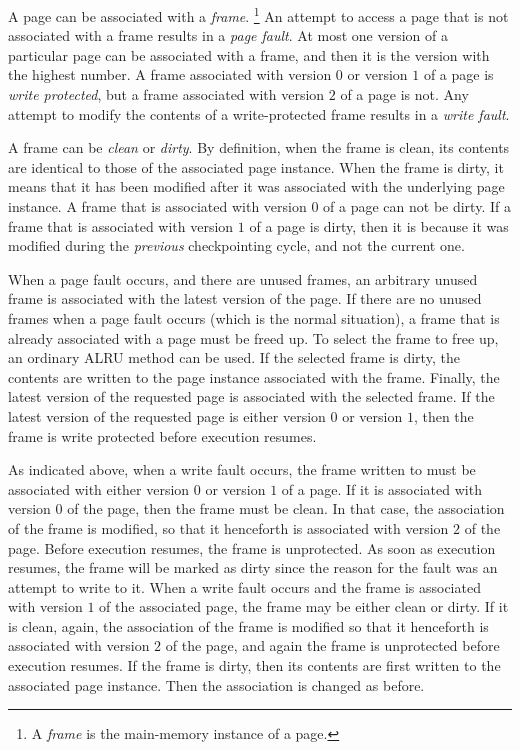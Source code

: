 A page can be associated with a \emph{frame}.%
\footnote{A \emph{frame} is the main-memory instance of a page.}  An
attempt to access a page that is not associated with a frame results
in a \emph{page fault}.  At most one version of a particular page can
be associated with a frame, and then it is the version with the
highest number.  A frame associated with version $0$ or version $1$ of
a page is \emph{write protected}, but a frame associated with version
$2$ of a page is not.  Any attempt to modify the contents of a
write-protected frame results in a \emph{write fault}.

A frame can be \emph{clean} or \emph{dirty}.  By definition, when the
frame is clean, its contents are identical to those of the associated
page instance.  When the frame is dirty, it means that it has been
modified after it was associated with the underlying page instance.  A
frame that is associated with version $0$ of a page can not be dirty.
If a frame that is associated with version $1$ of a page is dirty,
then it is because it was modified during the \emph{previous}
checkpointing cycle, and not the current one.

When a page fault occurs, and there are unused frames, an arbitrary
unused frame is associated with the latest version of the page.  If
there are no unused frames when a page fault occurs (which is the
normal situation), a frame that is already associated with a page must
be freed up.  To select the frame to free up, an ordinary ALRU method
can be used.  If the selected frame is dirty, the contents are written
to the page instance associated with the frame.  Finally, the latest
version of the requested page is associated with the selected frame.
If the latest version of the requested page is either version $0$ or
version $1$, then the frame is write protected before execution
resumes.

As indicated above, when a write fault occurs, the frame written to
must be associated with either version $0$ or version $1$ of a page.
If it is associated with version $0$ of the page, then the frame must
be clean.  In that case, the association of the frame is modified, so
that it henceforth is associated with version $2$ of the page.  Before
execution resumes, the frame is unprotected.  As soon as execution
resumes, the frame will be marked as dirty since the reason for the
fault was an attempt to write to it.  When a write fault occurs and
the frame is associated with version $1$ of the associated page, the
frame may be either clean or dirty.  If it is clean, again, the
association of the frame is modified so that it henceforth is
associated with version $2$ of the page, and again the frame is
unprotected before execution resumes.  If the frame is dirty, then its
contents are first written to the associated page instance.  Then the
association is changed as before.

